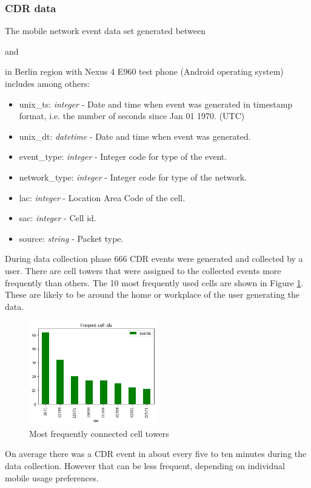 \subsubsection{CDR data}
The mobile network event data set generated between \date{2018/02/14} and \date{2018/02/21} in Berlin region with Nexus 4 E960 test phone (Android operating system) includes among others:
\begin{itemize}
\item unix\_ts: \textit{integer} - Date and time when event was generated in timestamp format, i.e. the number of seconds since Jan 01 1970. (UTC)
\item unix\_dt: \textit{datetime} - Date and time when event was generated.
\item event\_type: \textit{integer} - Integer code for type of the event.
\item network\_type: \textit{integer} - Integer code for type of the network.
\item lac: \textit{integer} - Location Area Code of the cell.
\item sac: \textit{integer} - Cell id.
\item source: \textit{string} - Packet type.
\end{itemize}

During data collection phase 666 CDR events were generated and collected by a user. There are cell towers that were assigned to the collected events more frequently than others. The 10 most frequently used cells are shown in Figure \ref{fig:freq_cells}. These are likely to be around the home or workplace of the user generating the data.

\begin{figure}[h]
    \centering
    \includegraphics[width=0.5\textwidth]{images/frequent_cell_ids.png}
    \caption{Most frequently connected cell towers}
    \label{fig:freq_cells}
\end{figure}

On average there was a CDR event in about every five to ten minutes during the data collection. However that can be less frequent, depending on individual mobile usage preferences. 

